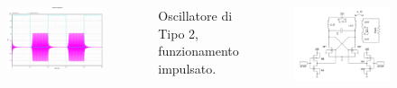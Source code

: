 \documentclass{beamer}
\begin{document}
\begin{frame}
\begin{columns}
\begin{figure}
\includegraphics[width=\textwidth]{images/tipo2-impulsato.pdf}
\end{figure}
Oscillatore di Tipo 2, funzionamento impulsato.

	\vspace{0.5cm}
	\begin{figure}
	\includegraphics[width=1.3\textwidth]{images/tipo2.pdf}
	\end{figure}
\end{columns}
\end{frame}
\end{document}
